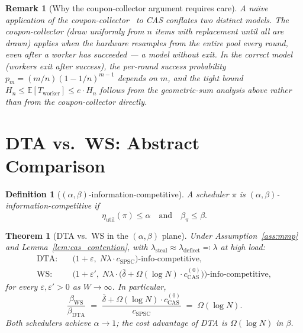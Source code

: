 \documentclass[11pt,a4paper]{article}
\newtheorem{theorem}{Theorem}[section]
\newtheorem{definition}{Definition}[section]
\newtheorem{remark}{Remark}[section]
\begin{document}
\begin{remark}[Why the coupon-collector argument requires care]
A na\"\i{}ve application of the coupon-collector~\cite{mitzenmacher2017} to CAS conflates two
distinct models.  The coupon-collector (draw uniformly from $n$ items
\emph{with replacement} until all are drawn) applies when the hardware
\emph{resamples} from the entire pool every round, even after a worker
has succeeded --- a model without exit.  In the correct model (workers
\emph{exit} after success), the per-round success probability
$p_m = (m/n)(1-1/n)^{m-1}$ depends on $m$, and the tight bound
$H_n \leq \mathbb{E}[T_{\mathrm{worker}}] \leq e\cdot H_n$ follows from
the geometric-sum analysis above rather than from the coupon-collector
directly.
\end{remark}

\section{DTA vs.\ WS: Abstract Comparison}
\label{sec:dta_ws_abstract}

\begin{definition}[$(\alpha,\beta)$-information-competitive]\label{def:alpha_beta}
A scheduler $\pi$ is \emph{$(\alpha,\beta)$-information-competitive} if
\[
  \eta_{\mathrm{util}}(\pi) \leq \alpha
  \quad\text{and}\quad
  \beta_\pi \leq \beta.
\]
\end{definition}

\begin{theorem}[DTA vs.\ WS in the $(\alpha,\beta)$ plane]
\label{thm:alpha_beta}
Under Assumption~\ref{ass:mmp} and Lemma~\ref{lem:cas_contention},
with $\lambda_{\mathrm{steal}} \approx \lambda_{\mathrm{deflect}} \eqqcolon \lambda$
at high load:
\begin{align}
  \text{DTA:}\quad &
    \bigl(1+\varepsilon,\;
      N\lambda\cdot c_{\mathrm{SPSC}}\bigr)\text{-info-competitive},
      \label{eq:dta_ab}\\[4pt]
  \text{WS:}\quad &
    \bigl(1+\varepsilon',\;
      N\lambda\cdot\bigl(\bar\delta + \Omega(\log N)\cdot c_{\mathrm{CAS}}^{(0)}\bigr)\bigr)
      \text{-info-competitive},
      \label{eq:ws_ab}
\end{align}
for every $\varepsilon, \varepsilon' > 0$ as $W \to \infty$.
In particular,
\begin{equation}\label{eq:beta_ratio}
  \frac{\beta_{\mathrm{WS}}}{\beta_{\mathrm{DTA}}}
  \;=\;
  \frac{\bar\delta + \Omega(\log N)\cdot c_{\mathrm{CAS}}^{(0)}}{c_{\mathrm{SPSC}}}
  \;=\; \Omega(\log N).
\end{equation}
Both schedulers achieve $\alpha \to 1$; the cost advantage of DTA
is $\Omega(\log N)$ in $\beta$.
\end{theorem}
\end{document}
